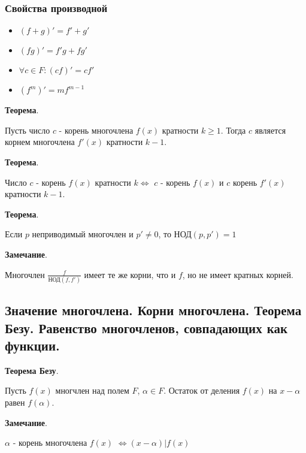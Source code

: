 \documentclass[a4paper]{article}
\begin{document}
\subsubsection*{Свойства производной}
\begin{itemize}
\item $(f+g)' = f'+g'$
\item $(fg)' = f'g+fg'$
\item $\forall c \in F: (cf)' = cf'$
\item $(f^m)' = mf^{m-1}$
\end{itemize}

\begin{htheorem}\textbf{Теорема}.

Пусть число $c$ - корень многочлена $f(x)$ кратности $k \geq 1$. Тогда $c$ является корнем многочлена $f'(x)$ кратности $k-1$.
\end{htheorem}


\begin{htheorem}\textbf{Теорема}.

Число $c$ - корень $f(x)$ кратности $k \Leftrightarrow$ $c$ - корень $f(x)$ и $c$ корень $f'(x)$ кратности $k-1$.
\end{htheorem}

\begin{htheorem}\textbf{Теорема}.

Если $p$ неприводимый многочлен и $p' \neq 0$, то $\text{НОД}(p, p') = 1$
\end{htheorem}

\begin{htheorem}\textbf{Замечание}.

Многочлен $\frac{f}{\text{НОД}(f, f')}$ имеет те же корни, что и $f$, но не имеет кратных корней.
\end{htheorem}

\subsection*{Значение многочлена. Корни многочлена. Теорема Безу. Равенство многочленов, совпадающих как функции.}

\begin{htheorem}\textbf{Теорема Безу}.

Пусть $f(x)$ многчлен над полем $F$, $\alpha \in F$. Остаток  от деления $f(x)$ на $x-\alpha$ равен $f(\alpha)$.
\end{htheorem}

\begin{htheorem}\textbf{Замечание}.

$\alpha$ - корень многочлена $f(x)$ $\Leftrightarrow (x-\alpha) | f(x)$
\end{htheorem}
\end{document}
